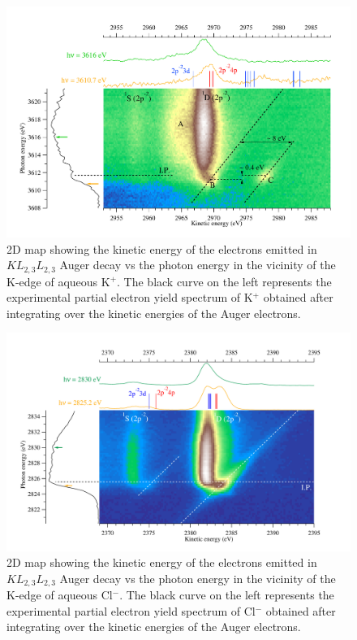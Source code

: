 \begin{figure}%
\centering
\includegraphics[scale=0.55]{figures/k_2dmap.pdf}
\caption{2D map showing the kinetic energy of the electrons emitted in $K L_{2,3}L_{2,3}$ Auger decay vs the photon energy in the vicinity of the K-edge of aqueous K$^{+}$. The black curve on the left represents the experimental partial electron yield spectrum of K$^{+}$ obtained after integrating over the kinetic energies of the Auger electrons.}
\label{fg:2dmap_k}
\end{figure}


\begin{figure}%
\centering
\includegraphics[scale=0.55]{figures/cl_2dmap.pdf}
\caption{2D map showing the kinetic energy of the electrons emitted in $K L_{2,3}L_{2,3}$ Auger decay vs the photon energy in the vicinity of the K-edge of aqueous Cl$^{-}$. The black curve on the left represents the experimental partial electron yield spectrum of Cl$^{-}$ obtained after integrating over the kinetic energies of the Auger electrons.}
\label{fg:2dmap_cl}
\end{figure}
%


